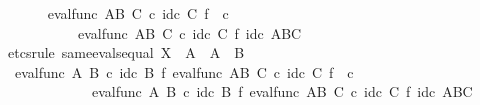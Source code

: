 \begin{isabellebody}
\ \ \ \ \isamarkupfalse%
\ {\isachardoublequoteopen}eval{\isacharunderscore}{\kern0pt}func\ {\isacharparenleft}{\kern0pt}A\isactrlbsup B\isactrlesup {\isacharparenright}{\kern0pt}\ C\ {\isasymcirc}\isactrlsub c\ id\isactrlsub c\ C\ {\isasymtimes}\isactrlsub f\ {\isasymphi}\isactrlsup {\isasymsharp}\isactrlsup {\isasymsharp}\ {\isasymcirc}\isactrlsub c\ {\isasympsi}\isactrlsup {\isasymsharp}\ {\isacharequal}{\kern0pt}\isanewline
\ \ \ \ \ \ \ \ \ \ eval{\isacharunderscore}{\kern0pt}func\ {\isacharparenleft}{\kern0pt}A\isactrlbsup B\isactrlesup {\isacharparenright}{\kern0pt}\ C\ {\isasymcirc}\isactrlsub c\ id\isactrlsub c\ C\ {\isasymtimes}\isactrlsub f\ id\isactrlsub c\ {\isacharparenleft}{\kern0pt}A\isactrlbsup B\isactrlesup \isactrlbsup C\isactrlesup {\isacharparenright}{\kern0pt}{\isachardoublequoteclose}\isanewline
\ \ \ \ \isamarkupfalse%
{\isacharparenleft}{\kern0pt}etcs{\isacharunderscore}{\kern0pt}rule\ same{\isacharunderscore}{\kern0pt}evals{\isacharunderscore}{\kern0pt}equal{\isacharbrackleft}{\kern0pt}\ X\ {\isacharequal}{\kern0pt}\ {\isachardoublequoteopen}A{\isachardoublequoteclose}{\isacharcomma}{\kern0pt}\ \ A\ {\isacharequal}{\kern0pt}\ {\isachardoublequoteopen}B{\isachardoublequoteclose}{\isacharbrackright}{\kern0pt}{\isacharparenright}{\kern0pt}\isanewline
\ \ \ \ \ \ \isamarkupfalse%
\ {\isachardoublequoteopen}eval{\isacharunderscore}{\kern0pt}func\ A\ B\ {\isasymcirc}\isactrlsub c\ id\isactrlsub c\ B\ {\isasymtimes}\isactrlsub f\ {\isacharparenleft}{\kern0pt}eval{\isacharunderscore}{\kern0pt}func\ {\isacharparenleft}{\kern0pt}A\isactrlbsup B\isactrlesup {\isacharparenright}{\kern0pt}\ C\ {\isasymcirc}\isactrlsub c\ {\isacharparenleft}{\kern0pt}id\isactrlsub c\ C\ {\isasymtimes}\isactrlsub f\ {\isasymphi}\isactrlsup {\isasymsharp}\isactrlsup {\isasymsharp}\ {\isasymcirc}\isactrlsub c\ {\isasympsi}\isactrlsup {\isasymsharp}{\isacharparenright}{\kern0pt}{\isacharparenright}{\kern0pt}\ {\isacharequal}{\kern0pt}\isanewline
\ \ \ \ \ \ \ \ \ \ \ \ eval{\isacharunderscore}{\kern0pt}func\ A\ B\ {\isasymcirc}\isactrlsub c\ id\isactrlsub c\ B\ {\isasymtimes}\isactrlsub f\ eval{\isacharunderscore}{\kern0pt}func\ {\isacharparenleft}{\kern0pt}A\isactrlbsup B\isactrlesup {\isacharparenright}{\kern0pt}\ C\ {\isasymcirc}\isactrlsub c\ id\isactrlsub c\ C\ {\isasymtimes}\isactrlsub f\ id\isactrlsub c\ {\isacharparenleft}{\kern0pt}A\isactrlbsup B\isactrlesup \isactrlbsup C\isactrlesup {\isacharparenright}{\kern0pt}{\isachardoublequoteclose}\isanewline
\ \ \ \ \ \ \isamarkupfalse%

\end{isabellebody}
